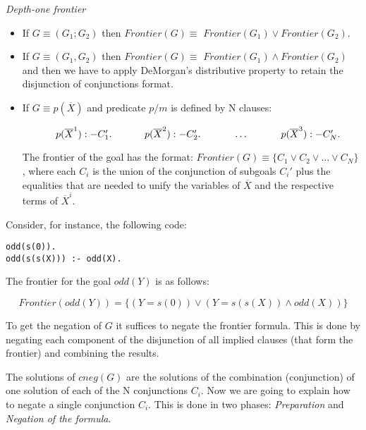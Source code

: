 \documentclass{llncs}
\begin{document}
\begin{definition}{\em Depth-one frontier}

    \begin{itemize} 

\item If $G \equiv (G_1;G_2) $ then $Frontier(G) \equiv$
$Frontier(G_1) \vee Frontier(G_2)$.

\item If $G \equiv (G_1,G_2) $ then $Frontier(G) \equiv$
  $Frontier(G_1) \wedge Frontier(G_2)$ and then we have to apply
  DeMorgan's distributive property to retain the disjunction
  of conjunctions format.
  
\item If $G \equiv p( \overline{X}) $ and 
  predicate $p/m$ is defined by N clauses:

$
~~~~~~~~~~p( \overline{X}^1):- C_1'. \\
~~~~~~~~~~p( \overline{X}^2):- C_2'. \\
~~~~~~~~~~\ldots \\
~~~~~~~~~~p( \overline{X}^3):- C_N'. \\
$

The frontier of the goal has the format: $Frontier(G) \equiv \{C_1
\vee C_2 \vee \ldots \vee C_N\}$, where each $C_i$ is the union of the
conjunction of subgoals $C_i'$ plus the equalities that are needed to
unify the variables of $\overline{X}$ and the respective terms of
$\overline{X}^i$.

    \end{itemize}

\end{definition}

\noindent
Consider, for instance, the following code:

\begin{verbatim}
odd(s(0)).
odd(s(s(X))) :- odd(X).
\end{verbatim}

The frontier for the goal $odd (Y)$ is as follows:

\[Frontier(odd(Y)) = \{ ( Y=s(0) ) \vee ( Y=s(s(X)) \wedge odd(X) ) \} \] 

To get the negation of $G$ it suffices to negate the frontier
formula. This is done by negating each component of the disjunction of
all implied clauses (that form the frontier) and combining the
results.


The solutions of $cneg(G)$ are the solutions of the combination
(conjunction) of one solution of each of the N conjunctions
$C_i$. Now we are going to explain how to negate a single
conjunction $C_i$. This is done in two phases: \emph{Preparation} and
\emph{Negation of the formula}.
\end{document}
